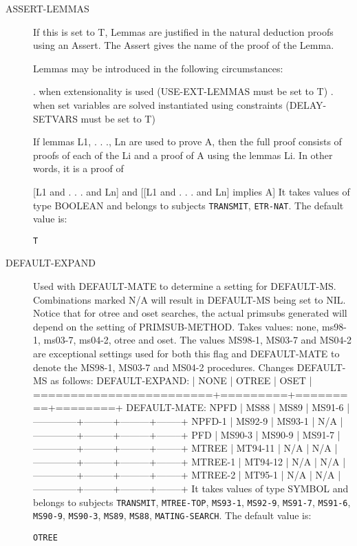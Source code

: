 \begin{description} 
\item[ASSERT-LEMMAS]  
If this is set to T, Lemmas are justified in the natural deduction 
proofs using an Assert.  The Assert gives the name of the proof of the Lemma.

Lemmas may be introduced in the following circumstances:

. when extensionality is used (USE-EXT-LEMMAS must be set to T)
. when set variables are solved instantiated using constraints
  (DELAY-SETVARS must be set to T)

If lemmas L1, . . ., Ln are used to prove A, then the full proof
consists of proofs of each of the Li and a proof of A using the
lemmas Li.  In other words, it is a proof of

[L1 and . . . and Ln] and [[L1 and . . . and Ln] implies A]
It takes values of type BOOLEAN and belongs to subjects \texttt{TRANSMIT}, \texttt{ETR-NAT}.  The default value is: \begin{lstlisting}
T
\end{lstlisting}

\item[DEFAULT-EXPAND]  
Used with DEFAULT-MATE to determine a setting for DEFAULT-MS.
Combinations marked N/A will result in DEFAULT-MS being set to NIL.
Notice that for otree and oset searches, the actual primsubs generated will
depend on the setting of PRIMSUB-METHOD.
Takes values: none, ms98-1, ms03-7, ms04-2, otree and oset.
The values MS98-1, MS03-7 and MS04-2 are exceptional settings used for both this flag and 
DEFAULT-MATE to denote the MS98-1, MS03-7 and MS04-2 procedures.
Changes DEFAULT-MS as follows:
        DEFAULT-EXPAND:        |  NONE   |  OTREE  |  OSET  |
       ========================+=========+=========+========+
DEFAULT-MATE:          NPFD    |  MS88   |   MS89  | MS91-6 |
                 --------------+---------+---------+--------+
                      NPFD-1   | MS92-9  |  MS93-1 |  N/A   |
                 --------------+---------+---------+--------+
                        PFD    | MS90-3  |  MS90-9 | MS91-7 |
                 --------------+---------+---------+--------+
                      MTREE    | MT94-11 |   N/A   |  N/A   |
                 --------------+---------+---------+--------+
                     MTREE-1   | MT94-12 |   N/A   |  N/A   |
                 --------------+---------+---------+--------+
                     MTREE-2   | MT95-1  |   N/A   |  N/A   |
                 --------------+---------+---------+--------+
It takes values of type SYMBOL and belongs to subjects \texttt{TRANSMIT}, \texttt{MTREE-TOP}, \texttt{MS93-1}, \texttt{MS92-9}, \texttt{MS91-7}, \texttt{MS91-6}, \texttt{MS90-9}, \texttt{MS90-3}, \texttt{MS89}, \texttt{MS88}, \texttt{MATING-SEARCH}.  The default value is: \begin{lstlisting}
OTREE
\end{lstlisting}


\end{description}
